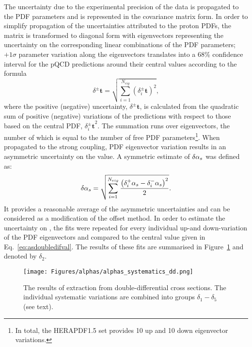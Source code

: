 The uncertainty due to the experimental precision of the data is propagated to the PDF parameters and is represented in the covariance matrix form. In order to simplify propagation of the uncertainties attributed to the proton PDFs, the matrix is transformed to diagonal form with eigenvectors representing the uncertainty on the corresponding linear combinations of the PDF parameters; $+1\sigma$ parameter variation along the eigenvectors translates into a 68\% confidence interval for the pQCD predictions around their central values according to the formula~\cite{Campbell:2006wx}
\begin{equation}
 \delta^{\pm}\mathbf{t} = \sqrt{\sum_{i=1}^{N_{eig}}{\left(\mbox{$\delta_i^{\pm}\mathbf{t}$}\right)^2}},
 \label{eq:mastereq}
\end{equation}
where the positive (negative) uncertainty, $\delta^{\pm}\mathbf{t}$, is calculated from the quadratic sum of positive (negative) variations of the predictions with respect to those based on the central PDF, $\mbox{$\delta_i^{\pm}\mathbf{t}$}^2$. The summation runs over eigenvectors, the number of which is equal to the number of free PDF parameters\footnote{In total, the HERAPDF1.5 set provides 10 up and 10 down eigenvector variations.}. When propagated to the strong coupling, PDF eigenvector variation results in an asymmetric uncertainty on the \as value. A symmetric estimate of $\delta\mbox{$\alpha_{s}$}$ was defined as:
\begin{equation}
 \delta\mbox{$\alpha_{s}$} = \sqrt{\sum_{i=1}^{N_{eig}}{\frac{\left(\mbox{$\delta_i^{+}\mbox{$\alpha_{s}$}$} - \mbox{$\delta_i^{-}\mbox{$\alpha_{s}$}$}\right)^2}{2}}}.
 \label{eq:mastereqsym}
\end{equation}
It provides a reasonable average of the asymmetric uncertainties and can be considered as a modification of the offset method. In order to estimate the uncertainty on \asz, the \as fits were repeated for every individual up-and down-variation of the PDF eigenvectors and compared to the central value given in Eq.~\ref{eq:asdoubledifval}. The results of these fits are summarised in Figure~\ref{fig:asthunc_dd} and denoted by $\delta_2$.
\begin{landscape}
\begin{figure}[p]
 \centering
 \caption{The results of \asz extraction from double-differential cross sections. The individual systematic variations are combined into groups $\delta_1-\delta_5$ (see text).}
 \label{fig:asthunc_dd}
 \texttt{[image: Figures/alphas/alphas\_systematics\_dd.png]}
\end{figure}
\end{landscape}

